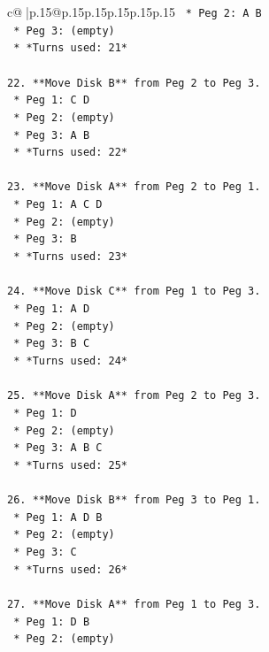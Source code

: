 \documentclass{article}
\begin{document}
{\begin{supertabular}{c@{$\;$}|p{.15\linewidth}@{}p{.15\linewidth}p{.15\linewidth}p{.15\linewidth}p{.15\linewidth}p{.15\linewidth}}
{{{\texttt{    *   Peg 2: A B} \\
\texttt{    *   Peg 3: (empty)} \\
\texttt{    *   *Turns used: 21*} \\
\\ 
\texttt{22. **Move Disk B** from Peg 2 to Peg 3.} \\
\texttt{    *   Peg 1: C D} \\
\texttt{    *   Peg 2: (empty)} \\
\texttt{    *   Peg 3: A B} \\
\texttt{    *   *Turns used: 22*} \\
\\ 
\texttt{23. **Move Disk A** from Peg 2 to Peg 1.} \\
\texttt{    *   Peg 1: A C D} \\
\texttt{    *   Peg 2: (empty)} \\
\texttt{    *   Peg 3: B} \\
\texttt{    *   *Turns used: 23*} \\
\\ 
\texttt{24. **Move Disk C** from Peg 1 to Peg 3.} \\
\texttt{    *   Peg 1: A D} \\
\texttt{    *   Peg 2: (empty)} \\
\texttt{    *   Peg 3: B C} \\
\texttt{    *   *Turns used: 24*} \\
\\ 
\texttt{25. **Move Disk A** from Peg 2 to Peg 3.} \\
\texttt{    *   Peg 1: D} \\
\texttt{    *   Peg 2: (empty)} \\
\texttt{    *   Peg 3: A B C} \\
\texttt{    *   *Turns used: 25*} \\
\\ 
\texttt{26. **Move Disk B** from Peg 3 to Peg 1.} \\
\texttt{    *   Peg 1: A D B} \\
\texttt{    *   Peg 2: (empty)} \\
\texttt{    *   Peg 3: C} \\
\texttt{    *   *Turns used: 26*} \\
\\ 
\texttt{27. **Move Disk A** from Peg 1 to Peg 3.} \\
\texttt{    *   Peg 1: D B} \\
\texttt{    *   Peg 2: (empty)} \\
}}}
\end{supertabular}}
\end{document}
